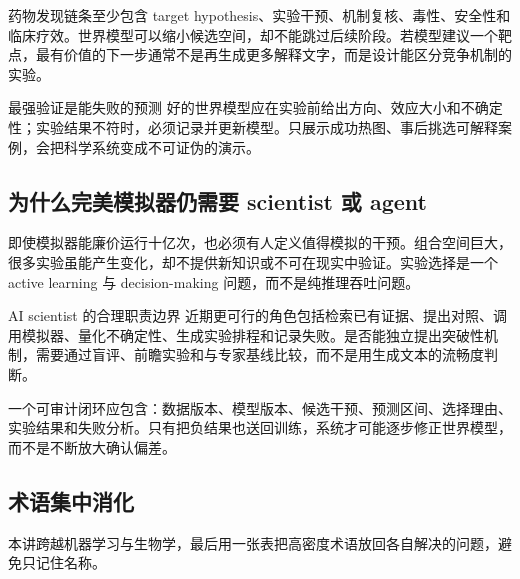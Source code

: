 \documentclass[a4paper]{article}
\begin{document}
药物发现链条至少包含 target hypothesis、实验干预、机制复核、毒性、安全性和临床疗效。世界模型可以缩小候选空间，却不能跳过后续阶段。若模型建议一个靶点，最有价值的下一步通常不是再生成更多解释文字，而是设计能区分竞争机制的实验。


\begin{importantbox}{最强验证是能失败的预测}
好的世界模型应在实验前给出方向、效应大小和不确定性；实验结果不符时，必须记录并更新模型。只展示成功热图、事后挑选可解释案例，会把科学系统变成不可证伪的演示。
\end{importantbox}

\subsection{为什么完美模拟器仍需要 scientist 或 agent}

即使模拟器能廉价运行十亿次，也必须有人定义值得模拟的干预。组合空间巨大，很多实验虽能产生变化，却不提供新知识或不可在现实中验证。实验选择是一个 active learning 与 decision-making 问题，而不是纯推理吞吐问题。



\begin{knowledgebox}{AI scientist 的合理职责边界}
近期更可行的角色包括检索已有证据、提出对照、调用模拟器、量化不确定性、生成实验排程和记录失败。是否能独立提出突破性机制，需要通过盲评、前瞻实验和与专家基线比较，而不是用生成文本的流畅度判断。
\end{knowledgebox}

一个可审计闭环应包含：数据版本、模型版本、候选干预、预测区间、选择理由、实验结果和失败分析。只有把负结果也送回训练，系统才可能逐步修正世界模型，而不是不断放大确认偏差。

\subsection{术语集中消化}

本讲跨越机器学习与生物学，最后用一张表把高密度术语放回各自解决的问题，避免只记住名称。
\end{document}
